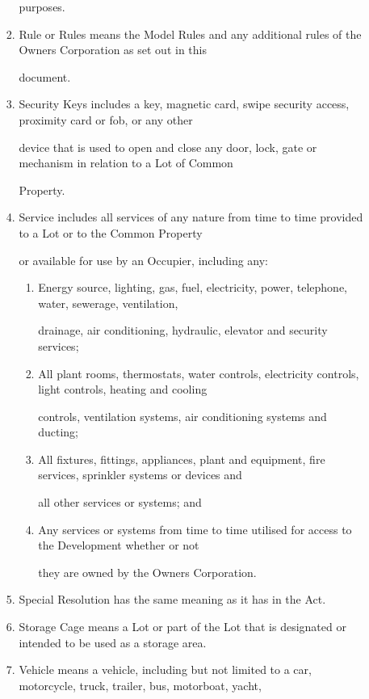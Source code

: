 \documentclass{article}
\begin{document}
\begin{enumerate}[label=\arabic*.]
\begin{enumerate}[label=\arabic{enumi}.\arabic*.]
\begin{enumerate}[label=(\arabic*)]
purposes. 

\item  Rule or Rules means the Model Rules and any additional rules of the Owners Corporation as set out in this 

document. 

\item  Security Keys includes a key, magnetic card, swipe security access, proximity card or fob, or any other 

device that is used to open and close any door, lock, gate or mechanism in relation to a Lot of Common 

Property. 

\item  Service includes all services of any nature from time to time provided to a Lot or to the Common Property 

or available for use by an Occupier, including any: 

\begin{enumerate}[label=(\alph*)]
\item  Energy source, lighting, gas, fuel, electricity, power, telephone, water, sewerage, ventilation, 

drainage, air conditioning, hydraulic, elevator and security services; 

\item  All plant rooms, thermostats, water controls, electricity controls, light controls, heating and cooling 

controls, ventilation systems, air conditioning systems and ducting; 

\item  All fixtures, fittings, appliances, plant and equipment, fire services, sprinkler systems or devices and 

all other services or systems; and 

\item  Any services or systems from time to time utilised for access to the Development whether or not 

they are owned by the Owners Corporation. 

\end{enumerate}
\item  Special Resolution has the same meaning as it has in the Act. 

\item  Storage Cage means a Lot or part of the Lot that is designated or intended to be used as a storage area. 

\item  Vehicle means a vehicle, including but not limited to a car, motorcycle, truck, trailer, bus, motorboat, yacht, 


\end{enumerate}
\end{enumerate}
\end{enumerate}
\end{document}
